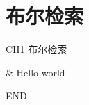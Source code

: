 \section{布尔检索}

\begin{frame}[fragile]{CH1 布尔检索}
\begin{easylist} \easyitem
& Hello world
\end{easylist}
\end{frame}

\begin{frame}
\begin{center}
    \Huge END
\end{center}

\end{frame}

